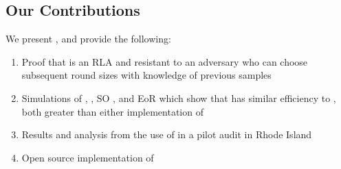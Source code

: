 \subsection{Our Contributions}
We present \Providence, and provide the following:
\begin{enumerate}
\item Proof that \Providence is an RLA and resistant to an adversary who can choose subsequent round sizes with knowledge of previous samples
\item Simulations of \Providence, \Minerva, SO \BRAVO, and EoR \BRAVO which show that \Providence has similar efficiency to \Minerva, both greater than either implementation of \BRAVO
\item Results and analysis from the use of \Providence in a pilot audit in Rhode Island
\item Open source implementation of \Providence 
\end{enumerate}


